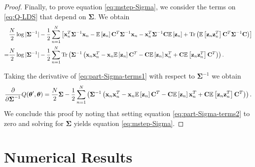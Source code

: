 \documentclass[11pt]{article}
\numberwithin{equation}{section}
\newcommand{\expectation}[1]{\mathbb{E}\left[#1\right]}
\newcommand{\Tr}[1]{\text{Tr}\left(#1\right)}
\newcommand{\x}{{\bf x}}
\newcommand{\z}{{\bf z}}
\begin{document}
\begin{proof}
	Finally, to prove equation \eqref{eq:mstep-Sigma}, we consider the terms on \eqref{eq:Q-LDS} that depend on $\boldsymbol{\Sigma}$. We obtain
	\begin{align}
		 & \frac{N}{2}\log\vert\boldsymbol\Sigma^{-1}\vert -\frac{1}{2}\sum_{n=1}^N \left[ \x_n^T \boldsymbol{\Sigma}^{-1}\x_n - \expectation{\z_n}{\bf C}^T\boldsymbol{\Sigma}^{-1}\x_n - \x_n^T \boldsymbol{\Sigma}^{-1}{\bf C}\expectation{\z_n} + \Tr{\expectation{\z_n\z_n^T}{\bf C}^T\boldsymbol{\Sigma}^{-1}{\bf C}} \right]\\
		=& \frac{N}{2}\log\vert\boldsymbol\Sigma^{-1}\vert -\frac{1}{2}\sum_{n=1}^N\Tr{\boldsymbol\Sigma^{-1} \left( \x_n\x_n^T - \x_n\expectation{\z_n}{\bf C}^T - {\bf C}\expectation{\z_n}\x_n^T + {\bf C}\expectation{\z_n\z_n^T}{\bf C}^T \right)}. \label{eq:part-Sigma-terms1}
	\end{align}
	
	Taking the derivative of \eqref{eq:part-Sigma-terms1} with respect to $\boldsymbol{\Sigma}^{-1}$ we obtain
	\begin{align}
		\frac{\partial}{\partial \boldsymbol{\Sigma}^{-1}} Q(\boldsymbol\theta', \boldsymbol\theta) = \frac{N}{2}\boldsymbol{\Sigma} - \frac{1}{2}\sum_{n=1}^N\left( \boldsymbol\Sigma^{-1} \left( \x_n\x_n^T - \x_n\expectation{\z_n}{\bf C}^T - {\bf C}\expectation{\z_n}\x_n^T + {\bf C}\expectation{\z_n\z_n^T}{\bf C}^T \right) \right) \label{eq:part-Sigma-terms2}.
	\end{align}
	We conclude this proof by noting that setting equation \eqref{eq:part-Sigma-terms2} to zero and solving for $\boldsymbol{\Sigma}$ yields equation \eqref{eq:mstep-Sigma}.
\end{proof}

\section{Numerical Results}
\end{document}
